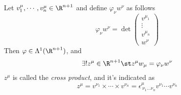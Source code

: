 \documentclass[../mmf.tex]{subfiles}
\begin{document}
\begin{dfn}
	Let $v^\mu_1,\cdots,v^\mu_n\in\R^{n+1}$ and define $\varphi_\nu w^\nu$ as follows
	\begin{equation*}
		\varphi_\nu w^\nu=\det\begin{pmatrix}v^{\mu_1}\\\vdots\\v^{\mu_n}\\w^\nu\end{pmatrix}
	\end{equation*}
	Then $\varphi\in\Lambda^1(\R^{n+1})$, and
	\begin{equation*}
		\exists!z^\mu\in\R^{n+1}\st z^\mu w_\mu=\varphi_\nu w^\nu
	\end{equation*}
	$z^\mu$ is called the \textit{cross product}, and it's indicated as
	\begin{equation*}
		z^\mu=v^{\nu_1}\times\cdots\times v^{\nu_n}=\epsilon^{\mu}_{\ \nu_1\ldots\nu_n}v^{\nu_1}\cdots v^{\nu_n}
	\end{equation*}
\end{dfn}
\end{document}
